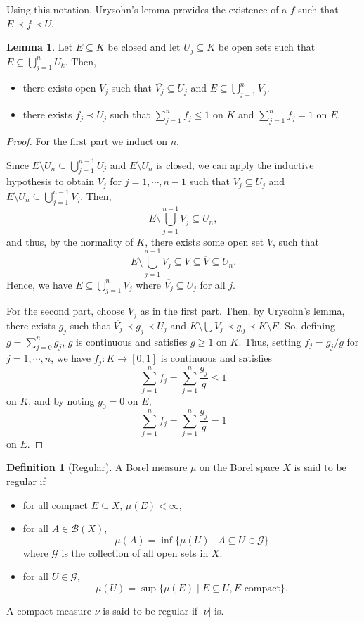 \documentclass[]{article}
\theoremstyle{definition}
\newtheorem{definition}{Definition}[section]
\newtheorem{lemma}{Lemma}[section]
\begin{document}
Using this notation, Urysohn's lemma provides the existence of a \(f\) such that \(E \prec f \prec U\).

\begin{lemma}
  Let \(E \subseteq K\) be closed and let \(U_j \subseteq K\) be open sets such 
  that \(E \subseteq \bigcup_{j = 1}^n U_k\). Then, 
  \begin{itemize}
    \item there exists open \(V_j\) such that \(\overline{V_j} \subseteq U_j\) and 
      \(E \subseteq \bigcup_{j = 1}^n V_j\).
    \item there exists \(f_j \prec U_j\) such that \(\sum_{j = 1}^n f_j \le 1\) on \(K\) and 
    \(\sum_{j = 1}^n f_j = 1\) on \(E\).
  \end{itemize}
\end{lemma}
\begin{proof}
  For the first part we induct on \(n\). 

  Since \(E \setminus U_n \subseteq \bigcup_{j = 1}^{n - 1} U_j\) and \(E \setminus U_n\) is closed, 
  we can apply the inductive hypothesis to obtain \(V_j\) for \(j = 1, \cdots, n - 1\) such that 
  \(\overline{V_j} \subseteq U_j\) and \(E \setminus U_n \subseteq \bigcup_{j = 1}^{n - 1} V_j\).
  Then,
  \[E \setminus \bigcup_{j = 1}^{n - 1} V_j \subseteq U_n,\] 
  and thus, by the normality of \(K\), there exists some open set \(V\), such that 
  \[E \setminus \bigcup_{j = 1}^{n - 1} V_j \subseteq V \subseteq \overline{V} \subseteq U_n.\]
  Hence, we have \(E \subseteq \bigcup_{j = 1}^n V_j\) where \(\overline{V_j} \subseteq U_j\) for all \(j\).

  For the second part, choose \(V_j\) as in the first part. Then, by Urysohn's lemma, there exists 
  \(g_j\) such that \(\overline{V_j} \prec g_j \prec U_j\) and 
  \(K \setminus \bigcup V_j \prec g_0 \prec K \setminus E\). So, defining 
  \(g = \sum_{j = 0}^n g_j\), \(g\) is continuous and satisfies \(g \ge 1\) on \(K\). Thus, 
  setting \(f_j = g_j / g\) for \(j = 1, \cdots, n\), we have \(f_j : K \to [0, 1]\) is continuous and satisfies 
  \[\sum_{j = 1}^n f_j = \sum_{j = 1}^n \frac{g_j}{g} \le 1\]
  on \(K\), and by noting \(g_0 = 0\) on \(E\),
  \[\sum_{j = 1}^n f_j = \sum_{j = 1}^n \frac{g_j}{g} = 1\]
  on \(E\).
\end{proof}

\begin{definition}[Regular]
  A Borel measure \(\mu\) on the Borel space \(X\) is said to be regular if 
  \begin{itemize}
    \item for all compact \(E \subseteq X\), \(\mu(E) < \infty\),
    \item for all \(A \in \mathcal{B}(X)\), 
      \[\mu(A) = \inf\{\mu(U) \mid A \subseteq U \in \mathcal{G}\}\]
      where \(\mathcal{G}\) is the collection of all open sets in \(X\).
    \item for all \(U \in \mathcal{G}\),
      \[\mu(U) = \sup\{\mu(E) \mid E \subseteq U, E \text{ compact}\}.\]
  \end{itemize}
  A compact measure \(\nu\) is said to be regular if \(|\nu|\) is.
\end{definition}
\end{document}
